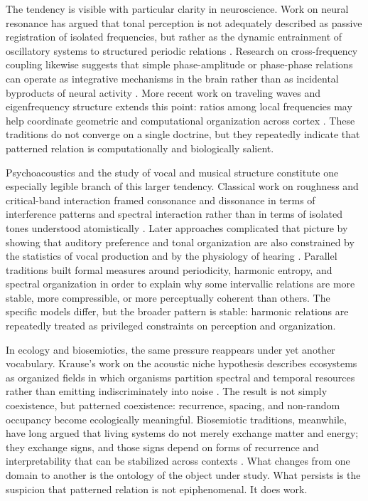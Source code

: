 The tendency is visible with particular clarity in neuroscience. Work on neural resonance has argued that tonal perception is not adequately described as passive registration of isolated frequencies, but rather as the dynamic entrainment of oscillatory systems to structured periodic relations \parencites{large_2012}{large_2005}. Research on cross-frequency coupling likewise suggests that simple phase-amplitude or phase-phase relations can operate as integrative mechanisms in the brain rather than as incidental byproducts of neural activity \parencite{canolty_2010}. More recent work on traveling waves and eigenfrequency structure extends this point: ratios among local frequencies may help coordinate geometric and computational organization across cortex \parencite{jacobs_2025}. These traditions do not converge on a single doctrine, but they repeatedly indicate that patterned relation is computationally and biologically salient.

Psychoacoustics and the study of vocal and musical structure constitute one especially legible branch of this larger tendency. Classical work on roughness and critical-band interaction framed consonance and dissonance in terms of interference patterns and spectral interaction rather than in terms of isolated tones understood atomistically \parencites{plomp_1965}{helmholtz_1863}. Later approaches complicated that picture by showing that auditory preference and tonal organization are also constrained by the statistics of vocal production and by the physiology of hearing \parencites{schwartz_2003}{bowling_2015}{bidelman_2009}. Parallel traditions built formal measures around periodicity, harmonic entropy, and spectral organization in order to explain why some intervallic relations are more stable, more compressible, or more perceptually coherent than others. The specific models differ, but the broader pattern is stable: harmonic relations are repeatedly treated as privileged constraints on perception and organization.

In ecology and biosemiotics, the same pressure reappears under yet another vocabulary. Krause's work on the acoustic niche hypothesis describes ecosystems as organized fields in which organisms partition spectral and temporal resources rather than emitting indiscriminately into noise \parencite{krause_2013}. The result is not simply coexistence, but patterned coexistence: recurrence, spacing, and non-random occupancy become ecologically meaningful. Biosemiotic traditions, meanwhile, have long argued that living systems do not merely exchange matter and energy; they exchange signs, and those signs depend on forms of recurrence and interpretability that can be stabilized across contexts \parencites{hoffmeyer_2008}{barbieri_2008}. What changes from one domain to another is the ontology of the object under study. What persists is the suspicion that patterned relation is not epiphenomenal. It does work.

